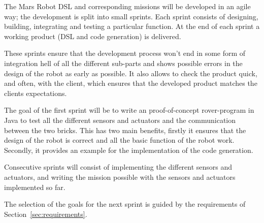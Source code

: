 The Mars Robot DSL and corresponding missions will be developed in an agile way;
the development is split into small sprints. Each sprint consists of designing,
building, integrating and testing a particular function. At the end of each
sprint a working product (DSL and code generation) is delivered. 

These sprints ensure that the development process won't end in some form of
integration hell of all the different sub-parts and shows possible errors
in the design of the robot as early as possible. It also allows to check the
product quick, and often, with the client, which ensures that the developed
product matches the clients expectations. 

\bigskip

The goal of the first sprint will be to write an proof-of-concept rover-program
in Java to test all the different sensors and actuators and the communication
between the two bricks. This has two main benefits, firstly it ensures that the
design of the robot is correct and all the basic function of the robot work.
Secondly, it provides an example for the implementation of the code generation.

Consecutive sprints will consist of implementing the different sensors and
actuators, and writing the mission possible with the sensors and actuators 
implemented so far. 

The selection of the goals for the next sprint is guided by the requirements of 
Section~\ref{sec:requirements}. 

